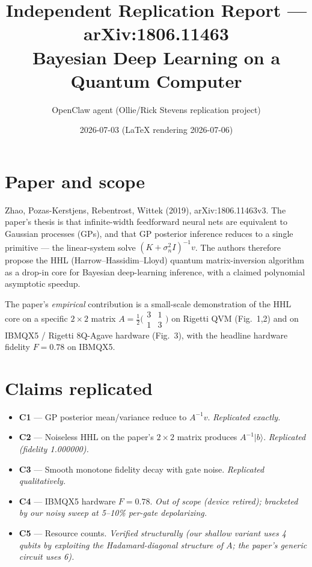 \documentclass[11pt]{article}
\title{Independent Replication Report --- arXiv:1806.11463 \\
\large Bayesian Deep Learning on a Quantum Computer}
\author{OpenClaw agent (Ollie/Rick Stevens replication project)}
\date{2026-07-03 (LaTeX rendering 2026-07-06)}
\begin{document}
\maketitle

\section{Paper and scope}

Zhao, Pozas-Kerstjens, Rebentrost, Wittek (2019), arXiv:1806.11463v3.
The paper's thesis is that infinite-width feedforward neural nets are
equivalent to Gaussian processes (GPs), and that GP posterior inference
reduces to a single primitive --- the linear-system solve
$(K + \sigma_n^2 I)^{-1} v$. The authors therefore propose the HHL
(Harrow--Hassidim--Lloyd) quantum matrix-inversion algorithm as a drop-in
core for Bayesian deep-learning inference, with a claimed polynomial
asymptotic speedup.

The paper's \emph{empirical} contribution is a small-scale demonstration
of the HHL core on a specific $2\times 2$ matrix
$A = \tfrac{1}{2}\bigl(\begin{smallmatrix}3&1\\1&3\end{smallmatrix}\bigr)$
on Rigetti QVM (Fig.~1,2) and on IBMQX5 / Rigetti 8Q-Agave hardware
(Fig.~3), with the headline hardware fidelity
$F=0.78$ on IBMQX5.

\section{Claims replicated}
\begin{itemize}
  \item \textbf{C1} --- GP posterior mean/variance reduce to
    $A^{-1}v$. \emph{Replicated exactly.}
  \item \textbf{C2} --- Noiseless HHL on the paper's $2\times 2$ matrix
    produces $A^{-1}|b\rangle$. \emph{Replicated (fidelity 1.000000).}
  \item \textbf{C3} --- Smooth monotone fidelity decay with gate
    noise. \emph{Replicated qualitatively.}
  \item \textbf{C4} --- IBMQX5 hardware $F=0.78$. \emph{Out of scope
    (device retired); bracketed by our noisy sweep at 5--10\%
    per-gate depolarizing.}
  \item \textbf{C5} --- Resource counts. \emph{Verified structurally
    (our shallow variant uses 4 qubits by exploiting the
    Hadamard-diagonal structure of $A$; the paper's generic
    circuit uses 6).}
\end{itemize}
\end{document}
